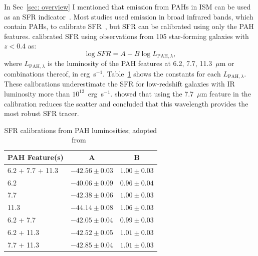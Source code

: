 In Sec~\ref{sec: overview} I mentioned that emission from PAHs in ISM can be used as an SFR indicator~\citep[e.g.][]{Peeters04}.
Most studies used emission in broad infrared bands, which contain PAHs, to calibrate SFR~\citep[e.g.][]{Calzetti07}, but SFR can be calibrated using only the PAH features.
\cite{Shipley16} calibrated SFR using observations from 105 star-forming galaxies with $z < 0.4$ as:
\begin{equation}
\log SFR = A + B \log L_{\mathrm{PAH}, \lambda},
\end{equation}
where $L_{\mathrm{PAH}, \lambda}$ is the luminosity of the PAH features at 6.2, 7.7, 11.3~$\mu$m or combinations thereof, in erg~s$^{-1}$.
Table~\ref{table_PAH} shows the constants for each $L_{\mathrm{PAH}, \lambda}$.
These calibrations underestimate the SFR for low-redshift galaxies with IR luminosity more than $10^{12}$~erg~s$^{-1}$.
\cite{Shipley16} showed that using the 7.7~$\mu$m feature in the calibration reduces the scatter and concluded that this wavelength provides the most robust SFR tracer.


\begin{table}
\caption{SFR calibrations from PAH luminosities; adopted from~\cite{Shipley16}}
\label{table_PAH}
\begin{center}
\begin{tabular}{ l c c}
\hline\hline
PAH Feature(s) & A & B\\
\hline
6.2 + 7.7 + 11.3 & $ -42.56 \pm 0.03 $ &  $1.00 \pm 0.03$ \\ 
6.2 & $ -40.06 \pm 0.09 $ &  $0.96 \pm 0.04$ \\ 
7.7 & $ -42.38 \pm 0.06 $ &  $1.00 \pm 0.03$ \\ 
11.3 & $ -44.14 \pm 0.08 $ &  $1.06 \pm 0.03$ \\ 
6.2 + 7.7 & $ -42.05 \pm 0.04 $ &  $0.99 \pm 0.03$ \\ 
6.2 + 11.3 & $ -42.52 \pm 0.05 $ &  $1.01 \pm 0.03$ \\ 
7.7 + 11.3 & $ -42.85 \pm 0.04 $ &  $1.01 \pm 0.03$ \\ 
\hline
\end{tabular}
\end{center}
\end{table}  


